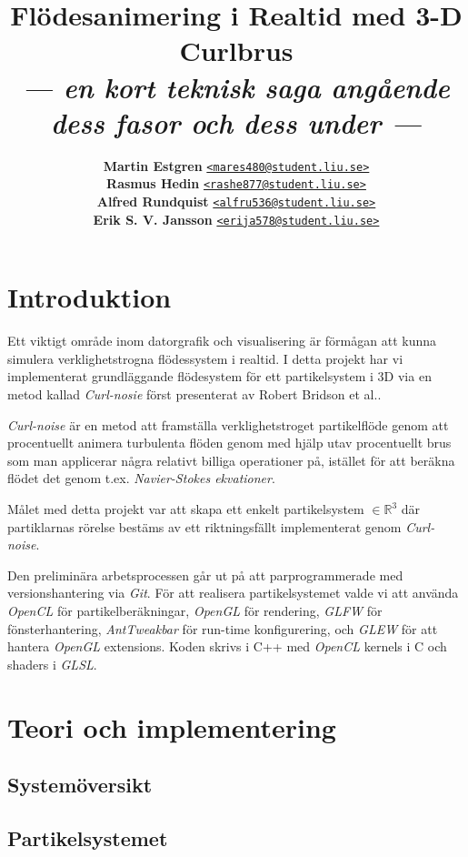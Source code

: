 \documentclass[a4paper]{article}
\date{\vspace{-1.8ex}} %
\title{\vspace{-2.2cm}\textbf{Flödesanimering i Realtid med 3-D Curlbrus}\\
       \Large{\textit{--- en kort teknisk saga angående dess fasor och dess under ---}}}
\author{{\textbf{Martin Estgren}}\;\;\;\;\;\; {\href{mailto:mares480@student.liu.se}{\texttt{<mares480@student.liu.se>}}}\\
        {\textbf{Rasmus Hedin}}\;\;\;\;\;\;\;\; {\href{mailto:rashe877@student.liu.se}{\texttt{<rashe877@student.liu.se>}}}\\
        {\textbf{Alfred Rundquist}}\;\;\; {\href{mailto:alfru536@student.liu.se}{\texttt{<alfru536@student.liu.se>}}}\\
        {\textbf{Erik S. V. Jansson}}\; {\href{mailto:erija578@student.liu.se}{\texttt{<erija578@student.liu.se>}}}}
\begin{document}
    \maketitle
\begin{multicols}{2}

    \section{Introduktion}

    Ett viktigt område inom datorgrafik och visualisering är förmågan att kunna simulera verklighetstrogna flödessystem i realtid. I detta projekt har vi implementerat grundläggande flödesystem för ett partikelsystem i 3D via en metod kallad \textit{Curl-nosie} först presenterat av Robert Bridson et al.\cite{bridson2007curl}.

    \textit{Curl-noise} är en metod att framställa verklighetstroget partikelflöde genom att procentuellt animera turbulenta flöden genom med hjälp utav procentuellt brus som man applicerar några relativt billiga operationer på, istället för att beräkna flödet det genom t.ex. \textit{Navier-Stokes ekvationer}. 

    Målet med detta projekt var att skapa ett enkelt partikelsystem $\in \mathbb{R}^3$ där partiklarnas rörelse bestäms av ett riktningsfällt implementerat genom \textit{Curl-noise}. 

    Den preliminära arbetsprocessen går ut på att parprogrammerade med versionshantering via  \textit{Git}. För att realisera partikelsystemet valde vi att använda \textit{OpenCL} för partikelberäkningar, \textit{OpenGL} för rendering, \textit{GLFW} för fönsterhantering, \textit{AntTweakbar} för run-time konfigurering, och \textit{GLEW} för att hantera \textit{OpenGL} extensions. Koden skrivs i C++ med \textit{OpenCL} kernels i C och shaders i \textit{GLSL}.

    \section{Teori och implementering}

     \subsection{Systemöversikt}

    \subsection{Partikelsystemet}


\end{multicols}
\end{document}

